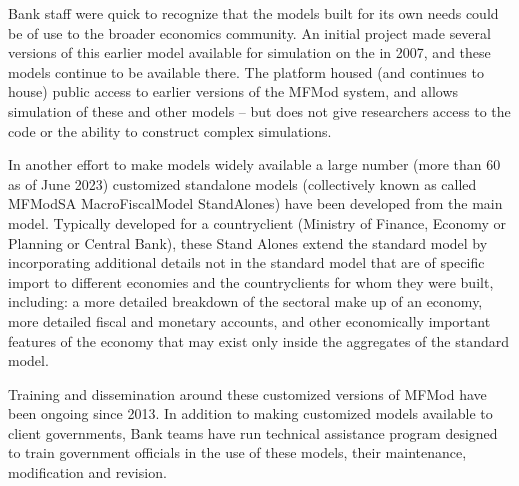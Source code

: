 \documentclass[letterpaper,10pt,english]{jupyterBook}
\begin{document}
\begin{DUlineblock}{0em}
\item[] 
\end{DUlineblock}

\sphinxAtStartPar
Bank staff were quick to recognize that the models built for its own needs could be of use to the broader economics community. An initial project  made several versions of this earlier model available for simulation on the  in 2007, and these models continue to be available there.  The  platform housed (and continues to house) public access to earlier versions of the MFMod system, and allows simulation of these and other models – but does not give researchers access to the code or the ability to construct complex simulations.

\sphinxAtStartPar
In another effort to make models widely available a large number (more than 60 as of June 2023) customized stand\sphinxhyphen{}alone models (collectively known as called MFModSA \sphinxhyphen{} MacroFiscalModel StandAlones)  have been developed from the main model. Typically developed for a country\sphinxhyphen{}client (Ministry of Finance, Economy or Planning or Central Bank), these Stand Alones extend the standard model by incorporating additional details not in the standard model that are of specific import to different economies and the country\sphinxhyphen{}clients for whom they were built, including: a more detailed breakdown of the sectoral make up of an economy, more detailed fiscal and monetary accounts, and other economically important features of the economy that may exist only inside the aggregates of the standard model.

\sphinxAtStartPar
Training and dissemination around these customized versions of MFMod have been ongoing since 2013. In addition to making customized models available to client governments, Bank teams have run technical assistance program designed to train government officials in the use of these models, their maintenance, modification and revision.

\begin{DUlineblock}{0em}
\item[] 
\end{DUlineblock}
\end{document}
